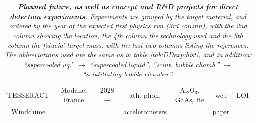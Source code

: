 \begin{table}[!t]
\begin{center}
{\begin{tabular}{ccccccc}
{\sc TESSERACT} &  Modane, France & 2028$\to$  & ath. phon.  &  Al${}_2$O${}_3$, GaAs, He & \href{https://tesseract.lbl.gov}{web} & \href{https://www.snowmass21.org/docs/files/summaries/CF/SNOWMASS21-CF1_CF2-IF1_IF8-120.pdf}{LOI} \\


{\sc Windchime} &   &  & accelerometers &   & \href{https://arxiv.org/pdf/2203.07242}{paper} & \cite{gravitational:DM:direct} \\

\hline\hline

\end{tabular}}
\end{center}
\caption[Main direct detection experiments]{\em  {\bfseries Planned future, as well as concept and R\&D projects for direct detection experiments}. Experiments are grouped by the target material, and ordered by the year of the expected first physics run (3rd column), with the 2nd column showing the location, the 4th column the technology used and the 5th column the fiducial target mass, with the last two columns listing the references.  The abbreviations used are the same as in table \ref{tab:DDexp:hist}, and in addition: ``supercooled liq.'' $\to$ ``supercooled liquid'', ``scint. bubble chamb.'' $\to$ ``scintillating  bubble chamber''.  
\label{tab:DDexp:fut}}
\end{table}



